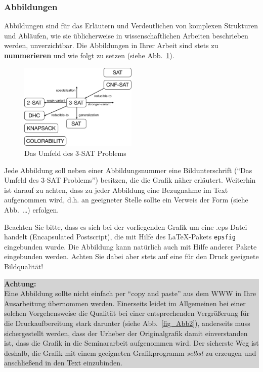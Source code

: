 \subsubsection{Abbildungen}
Abbildungen sind für das Erläutern und Verdeutlichen von komplexen Strukturen und Abläufen, wie sie üblicherweise in wissenschaftlichen Arbeiten beschrieben werden, unverzichtbar.
Die Abbildungen in Ihrer Arbeit sind stets zu {\bf nummerieren} und wie folgt zu setzen (siehe Abb.~\ref{fig_Abb1}).
\begin{figure}[ht]
  \begin{center}
  \includegraphics[width=0.5\textwidth]{images/3sat.pdf}
  \end{center}
  \caption{Das Umfeld des 3-SAT Problems}
  \label{fig_Abb1}
\end{figure} 

Jede Abbildung soll neben einer Abbildungsnummer eine Bildunterschrift ("`Das Umfeld des 3-SAT Problems"') besitzen, die die Grafik näher erläutert.
Weiterhin ist darauf zu achten, dass zu jeder Abbildung eine Bezugnahme im Text aufgenommen wird, d.h. an geeigneter Stelle sollte ein Verweis der Form (siehe Abb.~\dots) erfolgen.

Beachten Sie bitte, dass es sich bei der vorliegenden Grafik um eine .eps-Datei handelt (Encapsulated Postscript), die mit Hilfe des \LaTeX-Pakets {\tt epsfig} eingebunden wurde.
Die Abbildung kann natürlich auch mit Hilfe anderer Pakete eingebunden werden.
Achten Sie dabei aber stets auf eine für den Druck geeignete Bildqualität!

\smallskip

\begin{center}
\colorbox{lightgray}{
\parbox{140mm}{
{\bf Achtung:} \\
Eine Abbildung sollte nicht einfach per "`copy and paste"' aus dem WWW in Ihre Ausarbeitung übernommen werden. 
Einerseits leidet im Allgemeinen bei einer solchen Vorgehensweise die Qualität bei einer entsprechenden Vergrößerung für die Druckaufbereitung stark darunter (siehe Abb.~\ref{fig_Abb2}), anderseits muss sichergestellt werden, dass der Urheber der Originalgrafik damit einverstanden ist, dass die Grafik in die Seminararbeit aufgenommen wird.
Der sicherste Weg ist deshalb, die Grafik mit einem geeigneten Grafikprogramm {\em selbst} zu erzeugen und anschließend in den Text einzubinden.}}
\end{center}


